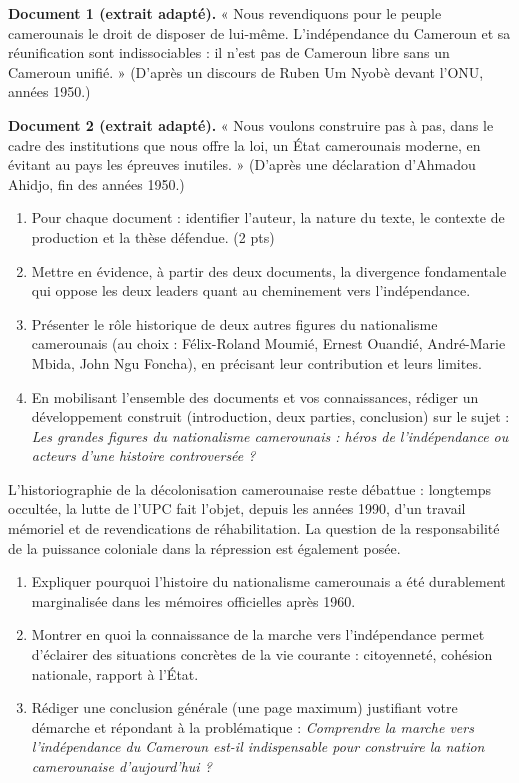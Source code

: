 \documentclass[11pt]{article}
\begin{document}
\begin{exercice}
\textbf{Document 1 (extrait adapté).} « Nous revendiquons pour le peuple camerounais le droit de disposer de lui-même. L'indépendance du Cameroun et sa réunification sont indissociables : il n'est pas de Cameroun libre sans un Cameroun unifié. » (D'après un discours de Ruben Um Nyobè devant l'ONU, années 1950.)

\textbf{Document 2 (extrait adapté).} « Nous voulons construire pas à pas, dans le cadre des institutions que nous offre la loi, un État camerounais moderne, en évitant au pays les épreuves inutiles. » (D'après une déclaration d'Ahmadou Ahidjo, fin des années 1950.)
\begin{enumerate}
\item Pour chaque document : identifier l'auteur, la nature du texte, le contexte de production et la thèse défendue. (2 pts)
\item Mettre en évidence, à partir des deux documents, la divergence fondamentale qui oppose les deux leaders quant au cheminement vers l'indépendance.
\item Présenter le rôle historique de deux autres figures du nationalisme camerounais (au choix : Félix-Roland Moumié, Ernest Ouandié, André-Marie Mbida, John Ngu Foncha), en précisant leur contribution et leurs limites.
\item En mobilisant l'ensemble des documents et vos connaissances, rédiger un développement construit (introduction, deux parties, conclusion) sur le sujet : \emph{Les grandes figures du nationalisme camerounais : héros de l'indépendance ou acteurs d'une histoire controversée ?}
\end{enumerate}
\end{exercice}

\begin{exercice}
L'historiographie de la décolonisation camerounaise reste débattue : longtemps occultée, la lutte de l'UPC fait l'objet, depuis les années 1990, d'un travail mémoriel et de revendications de réhabilitation. La question de la responsabilité de la puissance coloniale dans la répression est également posée.
\begin{enumerate}
\item Expliquer pourquoi l'histoire du nationalisme camerounais a été durablement marginalisée dans les mémoires officielles après 1960.
\item Montrer en quoi la connaissance de la marche vers l'indépendance permet d'éclairer des situations concrètes de la vie courante : citoyenneté, cohésion nationale, rapport à l'État.
\item Rédiger une conclusion générale (une page maximum) justifiant votre démarche et répondant à la problématique : \emph{Comprendre la marche vers l'indépendance du Cameroun est-il indispensable pour construire la nation camerounaise d'aujourd'hui ?}
\end{enumerate}
\end{exercice}
\end{document}
